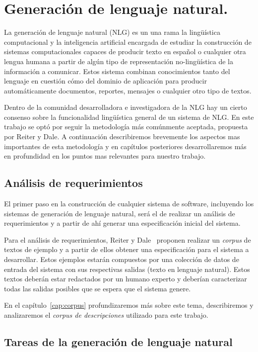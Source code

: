 \chapter{Generación de lenguaje natural.}
\label{cap:nlg_intro}
La generación de lenguaje natural (NLG) es un una rama la lingüística computacional y la inteligencia artificial encargada de estudiar la construcción de sistemas computacionales capaces de producir texto en español o cualquier otra lengua humana a partir de algún tipo de representación no-lingüística de la información a comunicar. Estos sistema combinan conocimientos tanto del lenguaje en cuestión cómo del dominio de aplicación para producir automáticamente documentos, reportes, mensajes o cualquier otro tipo de textos.

Dentro de la comunidad desarrolladora e investigadora de la NLG hay un cierto consenso sobre la funcionalidad lingüística general de un sistema de NLG.
En este trabajo se optó por seguir la metodología más comúnmente aceptada, propuesta por Reiter y Dale\cite{reiterdale}.
A continuación describiremos brevemente los aspectos mas importantes de esta metodología y en capítulos posteriores desarrollaremos más en profundidad en los puntos mas relevantes para nuestro trabajo.

\section{Análisis de requerimientos}
El primer paso en la construcción de cualquier sistema de software, incluyendo los sistemas de generación de lenguaje natural, será el de realizar un análisis de requerimientos y a partir de ahí generar una especificación inicial del sistema. 

Para el análisis de requerimientos, Reiter y Dale~\cite{reiter_dale} proponen realizar un \emph{corpus} de textos de ejemplo y a partir de ellos obtener una especificación para el sistema a desarrollar. Estos ejemplos estarán compuestos por una colección de datos de entrada del sistema con sus respectivas salidas (texto en lenguaje natural). Estos textos deberán estar redactados por un humano experto y deberían caracterizar todas las salidas posibles que se espera que el sistema genere.

En el capítulo~\ref{cap:corpus} profundizaremos más sobre este tema, describiremos y analizaremos el \emph{corpus de descripciones} utilizado para este trabajo.

\section{Tareas de la generación de lenguaje natural}

